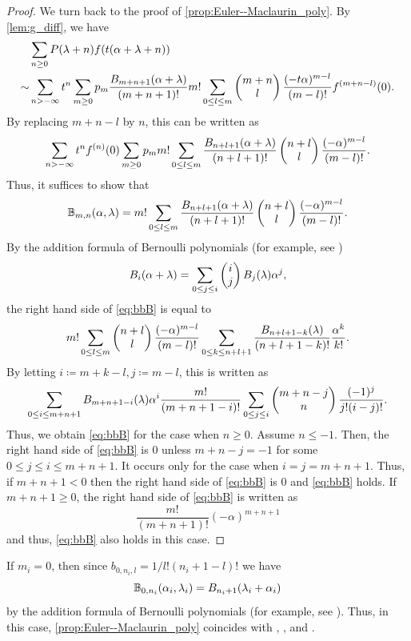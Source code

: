 \documentclass[11pt,a4paper,lualatex]{amsart}
\numberwithin{equation}{section} %
\begin{document}
\begin{proof}
	We turn back to the proof of \cref{prop:Euler--Maclaurin_poly}. 
	By \cref{lem:g_diff}, we have
	\begin{align}
		&\sum_{n \ge 0} P(\lambda + n) f(t(\alpha + \lambda + n)) \\
		\sim 
		&\sum_{n > - \infty} t^n \sum_{m \ge 0} p_m \frac{B_{m+n+1}(\alpha + \lambda)}{(m+n+1)!}
		m! \sum_{0 \le l \le m} \begin{pmatrix}m+n \\ l\end{pmatrix} \frac{(-t\alpha)^{m-l}}{(m-l)!} f^{(m+n-l)} (0).
	\end{align}
	By replacing $ m+n-l $ by $ n $, this can be written as
	\[
	\sum_{n > - \infty} t^n f^{(n)} (0) \sum_{m \ge 0} p_m 
	m! \sum_{0 \le l \le m} \frac{B_{n+l+1}(\alpha + \lambda)}{(n+l+1)!} \begin{pmatrix}n+l \\ l\end{pmatrix} \frac{(-\alpha)^{m-l}}{(m-l)!}.
	\]
	Thus, it suffices to show that
	\begin{equation} \label{eq:bbB}
		\mathbb{B}_{m, n}(\alpha, \lambda)
		= 
		m! \sum_{0 \le l \le m} \frac{B_{n+l+1}(\alpha + \lambda)}{(n+l+1)!} \begin{pmatrix}n+l \\ l\end{pmatrix} \frac{(-\alpha)^{m-l}}{(m-l)!}.
	\end{equation}
	By the addition formula of Bernoulli polynomials (for example, see \cite[Equation 23.1.7]{Handbook_formulas})
	\[
	B_i(\alpha + \lambda) = \sum_{0 \le j \le i} \begin{pmatrix}i \\ j\end{pmatrix} B_j(\lambda) \alpha^j,
	\]
	the right hand side of \cref{eq:bbB} is equal to
	\[
	m! \sum_{0 \le l \le m} \begin{pmatrix}n+l \\ l\end{pmatrix} \frac{(-\alpha)^{m-l}}{(m-l)!}
	\sum_{0 \le k \le n+l+1} \frac{B_{n+l+1-k}(\lambda)}{(n+l+1-k)!} \frac{\alpha^k}{k!}.
	\]
	By letting $ i \coloneqq m+k-l, j \coloneqq m-l $, this is written as
	\[
	\sum_{0 \le i \le m+n+1} B_{m+n+1-i}(\lambda) \alpha^i
	\frac{m!}{(m+n+1-i)!} \sum_{0 \le j \le i} \begin{pmatrix}m+n-j \\ n\end{pmatrix} \frac{(-1)^{j}}{j! (i-j)!}.
	\]
	Thus, we obtain \cref{eq:bbB} for the case when $ n \ge 0 $. 
	Assume $ n \le -1 $. 
	Then, the right hand side of \cref{eq:bbB} is $ 0 $ unless $ m+n-j = -1 $ for some $ 0 \le j \le i \le m+n+1 $. 
	It occurs only for the case when $ i = j = m+n+1 $. 
	Thus, if $ m+n+1 < 0 $ then the right hand side of \cref{eq:bbB} is $ 0 $ and \cref{eq:bbB} holds. 
	If $ m+n+1 \ge 0 $, the right hand side of \cref{eq:bbB} is written as
	\[
	\frac{m!}{(m+n+1)!} (-\alpha)^{m+n+1}
	\]
	and thus, \cref{eq:bbB} also holds in this case. 
\end{proof}

\begin{rem}
	If $ m_i = 0 $, then since $ b_{0, n_i, l} = 1/l! (n_i + 1 - l)! $ we have
	\[
	\mathbb{B}_{0, n_i} (\alpha_i, \lambda_i) = B_{n_i + 1} (\lambda_i + \alpha_i)
	\]
	by the addition formula of Bernoulli polynomials (for example, see \cite[Equation 23.1.7]{Handbook_formulas}).
	Thus, in this case, \cref{prop:Euler--Maclaurin_poly} coincides with \cite[Equation (44)]{Zagier_asymptotic}, \cite[Equation (2.8)]{BKM}, and \cite[Lemma 2.2]{BMM_high_depth}.
\end{rem}
\end{document}
